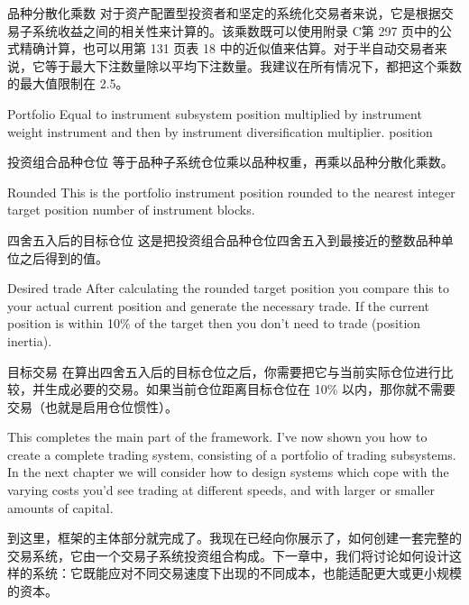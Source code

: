 \begin{chineseblock}品种分散化乘数 对于资产配置型投资者和坚定的系统化交易者来说，它是根据交易子系统收益之间的相关性来计算的。该乘数既可以使用附录 C第 297 页中的公式精确计算，也可以用第 131 页表 18 中的近似值来估算。对于半自动交易者来说，它等于最大下注数量除以平均下注数量。我建议在所有情况下，都把这个乘数的最大值限制在 2.5。 \end{chineseblock}

\bipairgap

\begin{englishblock} Portfolio Equal to instrument subsystem position multiplied by instrument weight instrument and then by instrument diversification multiplier. position \end{englishblock}

\begin{chineseblock}投资组合品种仓位 等于品种子系统仓位乘以品种权重，再乘以品种分散化乘数。\end{chineseblock}

\bipairgap

\begin{englishblock} Rounded This is the portfolio instrument position rounded to the nearest integer target position number of instrument blocks. \end{englishblock}

\begin{chineseblock}四舍五入后的目标仓位 这是把投资组合品种仓位四舍五入到最接近的整数品种单位之后得到的值。\end{chineseblock}

\bipairgap

\begin{englishblock} Desired trade After calculating the rounded target position you compare this to your actual current position and generate the necessary trade. If the current position is within 10\% of the target then you don't need to trade (position inertia). \end{englishblock}

\begin{chineseblock}目标交易 在算出四舍五入后的目标仓位之后，你需要把它与当前实际仓位进行比较，并生成必要的交易。如果当前仓位距离目标仓位在 10\% 以内，那你就不需要交易（也就是启用仓位惯性）。\end{chineseblock}

\bipairgap

\begin{englishblock} This completes the main part of the framework. I've now shown you how to create a complete trading system, consisting of a portfolio of trading subsystems. In the next chapter we will consider how to design systems which cope with the varying costs you'd see trading at different speeds, and with larger or smaller amounts of capital. \end{englishblock}

\begin{chineseblock}到这里，框架的主体部分就完成了。我现在已经向你展示了，如何创建一套完整的交易系统，它由一个交易子系统投资组合构成。下一章中，我们将讨论如何设计这样的系统：它既能应对不同交易速度下出现的不同成本，也能适配更大或更小规模的资本。\end{chineseblock}
